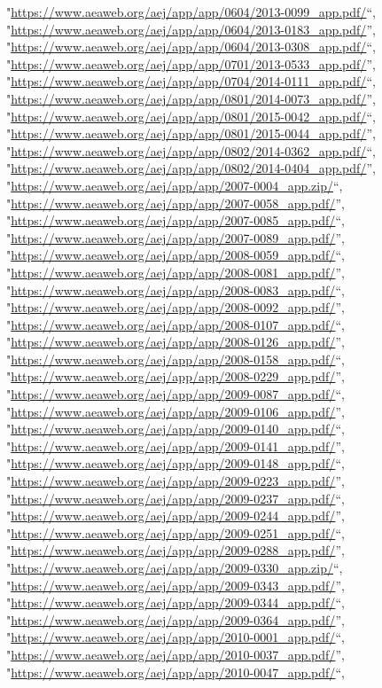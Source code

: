 \documentclass[]{article}
\begin{document}
\begin{itemize}
  "\url{https://www.aeaweb.org/aej/app/app/0604/2013-0099_app.pdf/}``,
  "\url{https://www.aeaweb.org/aej/app/app/0604/2013-0183_app.pdf/}'',
  "\url{https://www.aeaweb.org/aej/app/app/0604/2013-0308_app.pdf/}``,
  "\url{https://www.aeaweb.org/aej/app/app/0701/2013-0533_app.pdf/}'',
  "\url{https://www.aeaweb.org/aej/app/app/0704/2014-0111_app.pdf/}``,
  "\url{https://www.aeaweb.org/aej/app/app/0801/2014-0073_app.pdf/}'',
  "\url{https://www.aeaweb.org/aej/app/app/0801/2015-0042_app.pdf/}``,
  "\url{https://www.aeaweb.org/aej/app/app/0801/2015-0044_app.pdf/}'',
  "\url{https://www.aeaweb.org/aej/app/app/0802/2014-0362_app.pdf/}``,
  "\url{https://www.aeaweb.org/aej/app/app/0802/2014-0404_app.pdf/}'',
  "\url{https://www.aeaweb.org/aej/app/app/2007-0004_app.zip/}``,
  "\url{https://www.aeaweb.org/aej/app/app/2007-0058_app.pdf/}'',
  "\url{https://www.aeaweb.org/aej/app/app/2007-0085_app.pdf/}``,
  "\url{https://www.aeaweb.org/aej/app/app/2007-0089_app.pdf/}'',
  "\url{https://www.aeaweb.org/aej/app/app/2008-0059_app.pdf/}``,
  "\url{https://www.aeaweb.org/aej/app/app/2008-0081_app.pdf/}'',
  "\url{https://www.aeaweb.org/aej/app/app/2008-0083_app.pdf/}``,
  "\url{https://www.aeaweb.org/aej/app/app/2008-0092_app.pdf/}'',
  "\url{https://www.aeaweb.org/aej/app/app/2008-0107_app.pdf/}``,
  "\url{https://www.aeaweb.org/aej/app/app/2008-0126_app.pdf/}'',
  "\url{https://www.aeaweb.org/aej/app/app/2008-0158_app.pdf/}``,
  "\url{https://www.aeaweb.org/aej/app/app/2008-0229_app.pdf/}'',
  "\url{https://www.aeaweb.org/aej/app/app/2009-0087_app.pdf/}``,
  "\url{https://www.aeaweb.org/aej/app/app/2009-0106_app.pdf/}'',
  "\url{https://www.aeaweb.org/aej/app/app/2009-0140_app.pdf/}``,
  "\url{https://www.aeaweb.org/aej/app/app/2009-0141_app.pdf/}'',
  "\url{https://www.aeaweb.org/aej/app/app/2009-0148_app.pdf/}``,
  "\url{https://www.aeaweb.org/aej/app/app/2009-0223_app.pdf/}'',
  "\url{https://www.aeaweb.org/aej/app/app/2009-0237_app.pdf/}``,
  "\url{https://www.aeaweb.org/aej/app/app/2009-0244_app.pdf/}'',
  "\url{https://www.aeaweb.org/aej/app/app/2009-0251_app.pdf/}``,
  "\url{https://www.aeaweb.org/aej/app/app/2009-0288_app.pdf/}'',
  "\url{https://www.aeaweb.org/aej/app/app/2009-0330_app.zip/}``,
  "\url{https://www.aeaweb.org/aej/app/app/2009-0343_app.pdf/}'',
  "\url{https://www.aeaweb.org/aej/app/app/2009-0344_app.pdf/}``,
  "\url{https://www.aeaweb.org/aej/app/app/2009-0364_app.pdf/}'',
  "\url{https://www.aeaweb.org/aej/app/app/2010-0001_app.pdf/}``,
  "\url{https://www.aeaweb.org/aej/app/app/2010-0037_app.pdf/}'',
  "\url{https://www.aeaweb.org/aej/app/app/2010-0047_app.pdf/}``,

\end{itemize}
\end{document}
